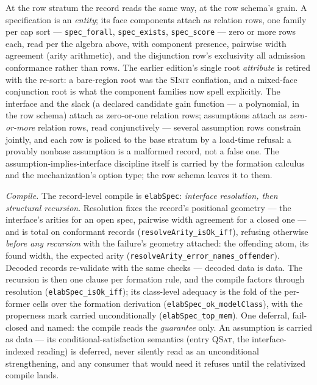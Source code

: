 At the row stratum the record reads the same way, at the row
schema's grain. A specification is an \emph{entity}; its face
components attach as relation rows, one family per cap sort ---
\texttt{spec\_forall}, \texttt{spec\_exists}, \texttt{spec\_score}
--- zero or more rows each, read per the algebra above, with
component presence, pairwise width agreement (arity arithmetic), and
the disjunction row's exclusivity all admission conformance rather
than rows. The earlier edition's single root \emph{attribute} is
retired with the re-sort: a bare-region root was the \textsc{SInit}
conflation, and a mixed-face conjunction root is what the
component families now spell explicitly. The interface and the slack
(a declared candidate gain function --- a polynomial, in the row
schema) attach as zero-or-one relation rows; assumptions attach as
\emph{zero-or-more} relation rows, read conjunctively --- several
assumption rows constrain jointly, and each row is policed to the
base stratum by a load-time refusal: a provably nonbase assumption
is a malformed record, not a false one. The
assumption-implies-interface discipline itself is carried by the
formation calculus and the mechanization's option type; the row
schema leaves it to them.

\emph{Compile.} The record-level compile is
\texttt{elabSpec}: \emph{interface resolution, then structural
recursion}. Resolution fixes the record's positional geometry ---
the interface's arities for an open spec, pairwise width agreement
for a closed one --- and is total on conformant records
(\texttt{resolveArity\_isOk\_iff}), refusing otherwise \emph{before
any recursion} with the failure's geometry attached: the offending
atom, its found width, the expected arity
(\texttt{resolveArity\_error\_names\_offender}). Decoded records
re-validate with the same checks --- decoded data is data. The
recursion is then one clause per formation rule, and the compile
factors through resolution (\texttt{elabSpec\_isOk\_iff}); its
class-level adequacy is the fold of the per-former cells over the
formation derivation (\texttt{elabSpec\_ok\_modelClass}), with the
properness mark carried unconditionally
(\texttt{elabSpec\_top\_mem}). One deferral, fail-closed and named:
the compile reads the \emph{guarantee} only. An assumption is
carried as data --- its conditional-satisfaction semantics (entry
\textsc{QSat}, the interface-indexed reading) is deferred, never
silently read as an unconditional strengthening, and any consumer
that would need it refuses until the relativized compile lands.

